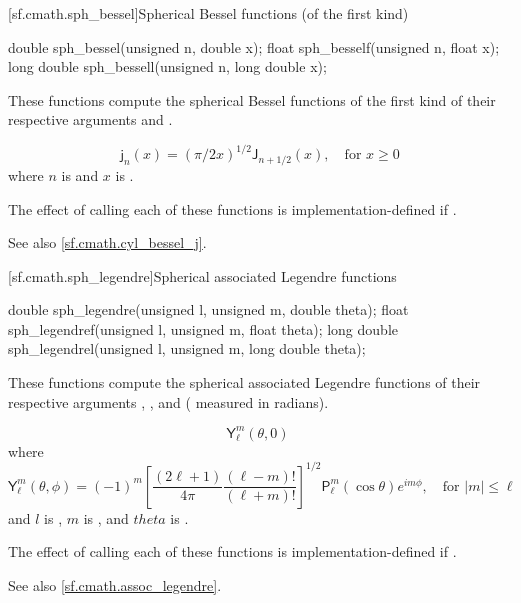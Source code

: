 [sf.cmath.sph_bessel]{Spherical Bessel functions (of the first kind)}%
%
%
%
%
%
\begin{itemdecl}
double       sph_bessel(unsigned n, double x);
float        sph_besself(unsigned n, float x);
long double  sph_bessell(unsigned n, long double x);
\end{itemdecl}

\begin{itemdescr}

\pnum\effects
These functions compute
the spherical Bessel functions of the first kind
of their respective arguments
 and .

\pnum\returns
\[%
  \mathsf{j}_n(x) =
  (\pi/2x)^{1\!/\!2} \mathsf{J}_{n + 1\!/\!2}(x),
	   \quad \mbox{for $x \ge 0$}
\]
where
$n$ is  and
$x$ is .

\pnum\remark
The effect of calling each of these functions
is implementation-defined
if .

\pnum See also \ref{sf.cmath.cyl_bessel_j}.
\end{itemdescr}

[sf.cmath.sph_legendre]{Spherical associated Legendre functions}%
%
%
%
%
%
%
\begin{itemdecl}
double       sph_legendre(unsigned l, unsigned m, double theta);
float        sph_legendref(unsigned l, unsigned m, float theta);
long double  sph_legendrel(unsigned l, unsigned m, long double theta);
\end{itemdecl}

\begin{itemdescr}
\pnum\effects
These functions compute the spherical associated Legendre functions
of their respective arguments
, , and  ( measured in radians).

\pnum\returns
\[%
  \mathsf{Y}_\ell^m(\theta, 0)
\;\]
where
\[%
  \mathsf{Y}_\ell^m(\theta, \phi) =
  (-1)^m \left[ \frac{(2 \ell + 1)}
                     {4 \pi}
	        \frac{(\ell - m)!}
	             {(\ell + m)!}
         \right]^{1/2}
	 \mathsf{P}_\ell^m
	 ( \cos\theta ) e ^ {i m \phi},
	   \quad \mbox{for $|m| \le \ell$}
\]
and
$l$ is ,
$m$ is , and
$theta$ is .

\pnum\remark
The effect of calling each of these functions
is implementation-defined
if .

\pnum See also \ref{sf.cmath.assoc_legendre}.
\end{itemdescr}

